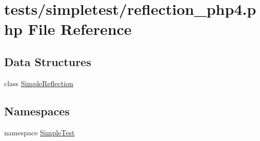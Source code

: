 \hypertarget{reflection__php4_8php}{\section{tests/simpletest/reflection\-\_\-php4.php File Reference}
\label{reflection__php4_8php}
}
\subsection*{Data Structures}
\begin{DoxyCompactItemize}
\item 
class \hyperlink{class_simple_reflection}{Simple\-Reflection}
\end{DoxyCompactItemize}
\subsection*{Namespaces}
\begin{DoxyCompactItemize}
\item 
namespace \hyperlink{namespace_simple_test}{Simple\-Test}
\end{DoxyCompactItemize}
